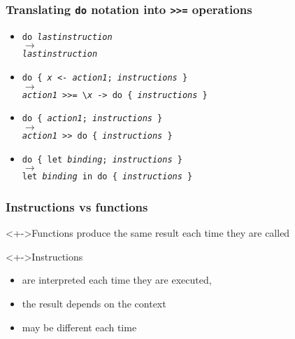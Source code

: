 \documentclass{beamer}
\begin{document}
\begin{frame}
  \frametitle{Translating \texttt{do} notation into \texttt{>>=} operations}
  \begin{itemize}
  \item \texttt{do \emph{lastinstruction}}
    \\ $\longrightarrow$
    \\ \texttt{\emph{lastinstruction}}
    \\[2ex]
  \item \texttt{do \{ \emph{x} <- \emph{action1}; \emph{instructions} \}}
    \\ $\longrightarrow$
    \\ \texttt{\emph{action1} >>= \textbackslash \emph{x} -> \texttt{do \{ \emph{instructions} \}}}
    \\[2ex]
  \item \texttt{do \{ \emph{action1}; \emph{instructions} \}}
    \\ $\longrightarrow$
    \\ \texttt{\emph{action1} >> \texttt{do \{ \emph{instructions} \}}}
    \\[2ex]
  \item \texttt{do \{ let \emph{binding}; \emph{instructions} \}}
    \\ $\longrightarrow$
    \\ \texttt{let \emph{binding} in do \{  \emph{instructions} \}}
  \end{itemize}
\end{frame}
\begin{frame}[fragile]
  \frametitle{Instructions vs functions}
  \begin{block}<+->{Functions}
    produce the same result each time they are called
  \end{block}
  \begin{block}<+->{Instructions}
    \begin{itemize}
    \item are interpreted each time they are executed,
    \item the result depends on the context
    \item may be different each time
    \end{itemize}
  \end{block}
\end{frame}
\end{document}
